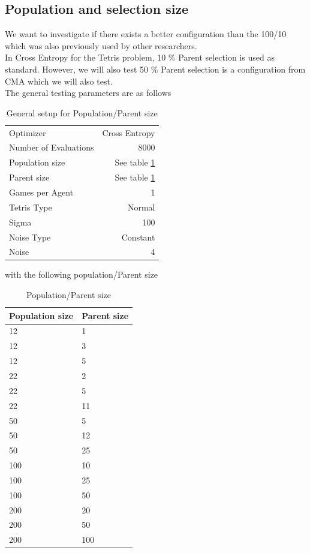 \subsection{Population and selection size}
We want to investigate if there exists a better configuration than the 100/10 which was also previously used by other researchers.\\
In Cross Entropy for the Tetris problem, 10 \% Parent selection is used as standard. However, we will also test 50 \% Parent selection is a configuration from CMA which we will also test.\\
The general testing parameters are as follows
\begin{table}[h]
\centering
\begin{tabular}{l r}
Optimizer & Cross Entropy\\
Number of Evaluations & 8000\\
Population size & See table \ref{CEPopulationParentSize}\\
Parent size & See table \ref{CEPopulationParentSize}\\
Games per Agent & 1\\
Tetris Type & Normal\\
\hline
Sigma & 100\\
Noise Type & Constant\\
Noise & 4
\end{tabular}
\caption{General setup for Population/Parent size}
\end{table}

with the following population/Parent size

\begin{table}[h]
\centering
\begin{tabular}{l l}
Population size & Parent size\\
\hline
12 & 1\\
12 & 3\\
12 & 5\\
22 & 2\\
22 & 5\\
22 & 11\\
50 & 5\\
50 & 12\\
50 & 25\\
100 & 10\\
100 & 25\\
100 & 50\\
200 & 20\\
200 & 50\\
200 & 100
\end{tabular}
\caption{Population/Parent size \label{CEPopulationParentSize}}
\end{table}

